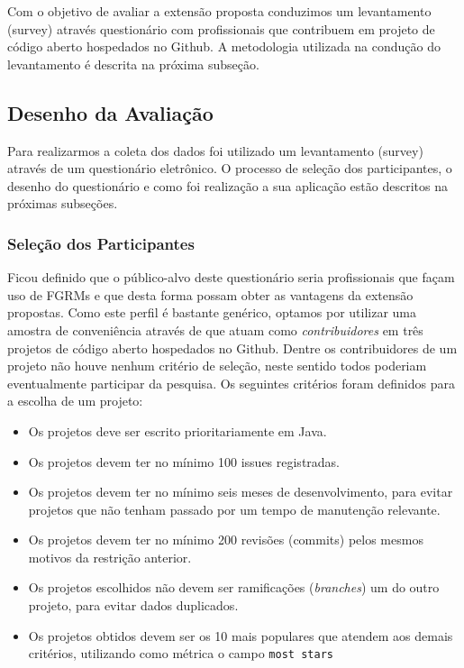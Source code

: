 Com o objetivo de avaliar a extensão proposta conduzimos um levantamento
(survey) através questionário com profissionais que contribuem em projeto de
código aberto hospedados no Github. A metodologia utilizada na condução do
levantamento é descrita na próxima subseção.

\subsection{Desenho da Avaliação}
\label{sub:implementacao_extenscao_desenho_da_avaliacao}

Para realizarmos a coleta dos dados foi utilizado um levantamento (survey)
através de um questionário eletrônico. O processo de seleção dos participantes,
o desenho do questionário e como foi realização a sua aplicação estão descritos
na próximas subseções.

\subsubsection{Seleção dos Participantes}
\label{ssub:sug_melhoria_selecao_participantes}

Ficou definido que o público-alvo deste questionário seria profissionais que
façam uso de FGRMs e que desta forma possam obter as vantagens da extensão
propostas. Como este perfil é bastante genérico, optamos por utilizar uma
amostra de conveniência através de que atuam como \textit{contribuidores} em três
projetos de código aberto hospedados no Github. Dentre os contribuidores de um
projeto não houve nenhum critério de seleção, neste sentido todos poderiam
eventualmente participar da pesquisa. Os seguintes critérios foram
definidos para a escolha de um projeto:

\begin{itemize}
	\item Os projetos deve ser escrito prioritariamente em Java.
    \item Os projetos devem ter no mínimo 100 issues registradas.
	\item Os projetos devem ter no mínimo seis meses de desenvolvimento, para
		evitar projetos que não tenham passado por um tempo de manutenção
		relevante.
	\item Os projetos devem  ter  no  mínimo  200  revisões (commits)  pelos
		mesmos motivos  da restrição anterior.
	\item Os projetos escolhidos não devem ser ramificações (\textsl{branches}) um
		do outro projeto, para evitar dados duplicados.
	\item Os projetos obtidos devem ser os 10 mais populares que atendem aos
		demais critérios, utilizando como métrica o campo \texttt{most stars}
\end{itemize}

